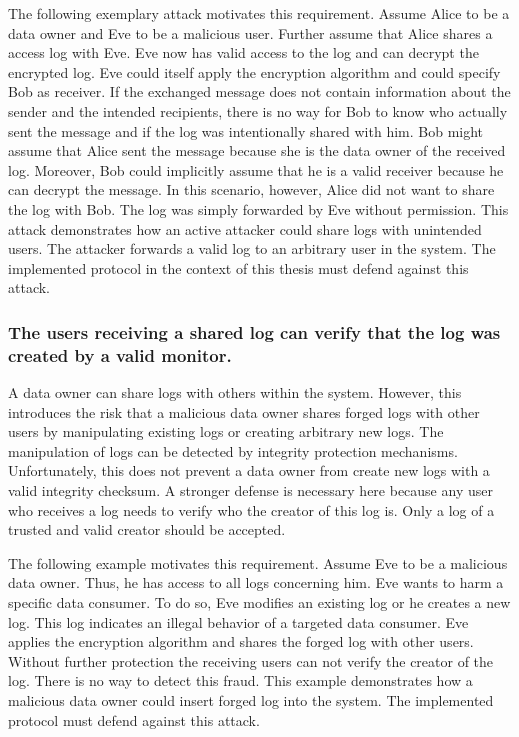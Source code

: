 \documentclass[../main.tex]{subfiles}
\begin{document}
The following exemplary attack motivates this requirement.
Assume Alice to be a data owner and Eve to be a malicious user.
Further assume that Alice shares a access log with Eve.
Eve now has valid access to the log and can decrypt the encrypted log.
Eve could itself apply the encryption algorithm and could specify Bob as receiver.
If the exchanged message does not contain information about the sender and the intended recipients, there is no way for Bob to know who actually sent the message and if the log was intentionally shared with him.
Bob might assume that Alice sent the message because she is the data owner of the received log.
Moreover, Bob could implicitly assume that he is a valid receiver because he can decrypt the message.
In this scenario, however, Alice did not want to share the log with Bob.
The log was simply forwarded by Eve without permission.
This attack demonstrates how an active attacker could share logs with unintended users.
The attacker forwards a valid log to an arbitrary user in the system.
The implemented protocol in the context of this thesis must defend against this attack.

\subsubsection{The users receiving a shared log can verify that the log was created by a valid monitor.}

A data owner can share logs with others within the system.
However, this introduces the risk that a malicious data owner shares forged logs with other users by manipulating existing logs or creating arbitrary new logs.
The manipulation of logs can be detected by integrity protection mechanisms.
Unfortunately, this does not prevent a data owner from create new logs with a valid integrity checksum.
A stronger defense is necessary here because any user who receives a log needs to verify who the creator of this log is.
Only a log of a trusted and valid creator should be accepted.

The following example motivates this requirement.
Assume Eve to be a malicious data owner.
Thus, he has access to all logs concerning him.
Eve wants to harm a specific data consumer.
To do so, Eve modifies an existing log or he creates a new log.
This log indicates an illegal behavior of a targeted data consumer.
Eve applies the encryption algorithm and shares the forged log with other users.
Without further protection the receiving users can not verify the creator of the log.
There is no way to detect this fraud.
This example demonstrates how a malicious data owner could insert forged log into the system.
The implemented protocol must defend against this attack.
\end{document}
